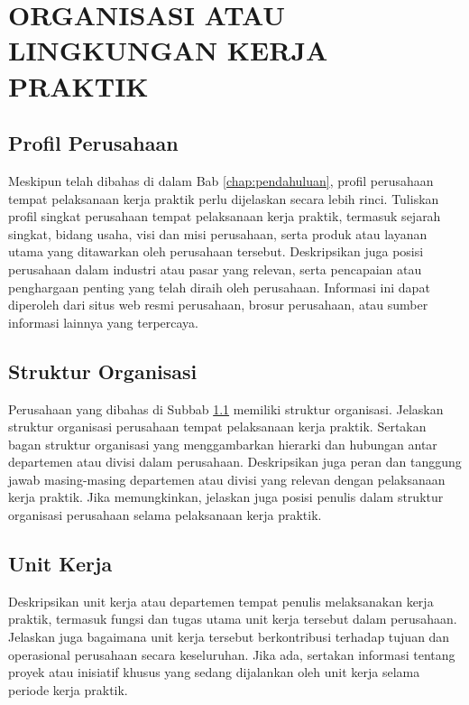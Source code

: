 \cleardoublepage %
\chapter{ORGANISASI ATAU LINGKUNGAN KERJA PRAKTIK}
\label{chap:organisasi_lingkungan}
\section{Profil Perusahaan}
\label{sec:profil_perusahaan}
Meskipun telah dibahas di dalam Bab \ref{chap:pendahuluan}, profil perusahaan tempat pelaksanaan kerja praktik perlu dijelaskan secara lebih rinci. Tuliskan profil singkat perusahaan tempat pelaksanaan kerja praktik, termasuk sejarah singkat, bidang usaha, visi dan misi perusahaan, serta produk atau layanan utama yang ditawarkan oleh perusahaan tersebut.
Deskripsikan juga posisi perusahaan dalam industri atau pasar yang relevan, serta pencapaian atau penghargaan penting yang telah diraih oleh perusahaan.
Informasi ini dapat diperoleh dari situs web resmi perusahaan, brosur perusahaan, atau sumber informasi lainnya yang terpercaya.
\section{Struktur Organisasi}
\label{sec:struktur_organisasi}
Perusahaan yang dibahas di Subbab \ref{sec:profil_perusahaan} memiliki struktur organisasi. Jelaskan struktur organisasi perusahaan tempat pelaksanaan kerja praktik.
Sertakan bagan struktur organisasi yang menggambarkan hierarki dan hubungan antar departemen atau divisi dalam perusahaan.
Deskripsikan juga peran dan tanggung jawab masing-masing departemen atau divisi yang relevan dengan pelaksanaan kerja praktik.
Jika memungkinkan, jelaskan juga posisi penulis dalam struktur organisasi perusahaan selama pelaksanaan kerja praktik.
\section{Unit Kerja}
\label{sec:unit_kerja}
Deskripsikan unit kerja atau departemen tempat penulis melaksanakan kerja praktik, termasuk fungsi dan tugas utama unit kerja tersebut dalam perusahaan.
Jelaskan juga bagaimana unit kerja tersebut berkontribusi terhadap tujuan dan operasional perusahaan secara keseluruhan.
Jika ada, sertakan informasi tentang proyek atau inisiatif khusus yang sedang dijalankan oleh unit kerja selama periode kerja praktik.
